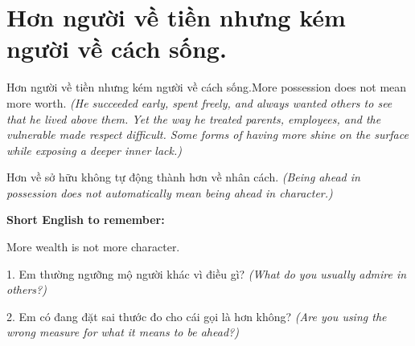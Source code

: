 \section{Hơn người về tiền nhưng kém người về cách sống.}
\begin{truyen}{Hơn người về tiền nhưng kém người về cách sống.}{More possession does not mean more worth.}
\textit{(He succeeded early, spent freely, and always wanted others to see that he lived above them. Yet the way he treated parents, employees, and the vulnerable made respect difficult. Some forms of having more shine on the surface while exposing a deeper inner lack.)}
\end{truyen}
\begin{baihoc}
Hơn về sở hữu không tự động thành hơn về nhân cách.
\textit{(Being ahead in possession does not automatically mean being ahead in character.)}
\end{baihoc}
\begin{ghinhoanh}
\textbf{Short English to remember:}

More wealth is not more character.
\end{ghinhoanh}
\begin{tuhocnhanh}
1. Em thường ngưỡng mộ người khác vì điều gì? \textit{(What do you usually admire in others?)}

2. Em có đang đặt sai thước đo cho cái gọi là hơn không? \textit{(Are you using the wrong measure for what it means to be ahead?)}
\end{tuhocnhanh}
\ngancach


